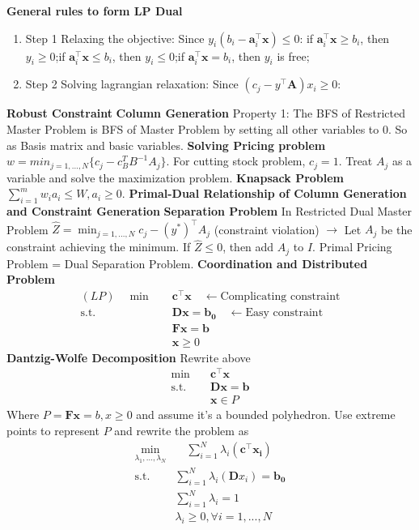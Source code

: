 \documentclass{article}
\def\x{\bm{x}}
\def\a{\bm{a}}
\def\A{\bm{A}}
\begin{document}
\textbf{General rules to form LP Dual}\
\begin{enumerate}
    \item Step 1 Relaxing the objective: Since $y_i(b_i-\a_i^\top \x ) \le 0$: if $\a_i^\top \x \ge b_i$, then $y_i \ge 0$;if $\a_i^\top \x \le b_i$, then $y_i \le 0$;if $\a_i^\top \x = b_i$, then $y_i$ is free;
    \item Step 2 Solving lagrangian relaxation: Since $(c_j-y^\top \A)x_i \ge 0$:
\end{enumerate}
\textbf{Robust Constraint}
\textbf{Column Generation} Property 1: The BFS of Restricted Master Problem is BFS of Master Problem by setting all other variables to 0. So as Basis matrix and basic variables.
\textbf{Solving Pricing problem} $w=min_{j=1,...,N}\{c_j-c_B^T B^{-1}A_j\}$. For cutting stock problem, $c_j=1$. Treat $A_j$ as a variable and solve the maximization problem.
\textbf{Knapsack Problem} $\sum_{i=1}^m w_ia_i \le W, a_i \ge 0$.
\textbf{Primal-Dual Relationship of Column Generation and Constraint Generation}
\textbf{Separation Problem} In Restricted Dual Master Problem $\hat{Z} = \min_{j=1,...,N}{c_j-(y^*)^\top A_j}$ (constraint violation) $\to$ Let $A_j$ be the constraint achieving the minimum. If $\hat{Z} \le 0$, then add $A_j$ to $I$. Primal Pricing Problem = Dual Separation Problem.
\textbf{Coordination and Distributed Problem}
\begin{align*}
    (LP) \quad \min \quad &\bm{c}^\top \bm{x} \quad \leftarrow \text{Complicating constraint} \\
    \text{s.t.} \quad & \bm{D}\bm{x}=\bm{b_0} \quad \leftarrow \text{Easy constraint}\\
    & \bm{F} \bm{x} = \bm{b} \\
    & \bm{x} \ge 0
\end{align*}
\textbf{Dantzig-Wolfe Decomposition} Rewrite above
\begin{align*}
    \min \quad & \bm{c}^\top \bm{x} \\
    \text{s.t.} \quad & \bm{D}\bm{x}=\bm{b} \\
    & \bm{x} \in P
\end{align*}
Where $P={\bm{F}\bm{x}=b, x \ge 0}$ and assume it's a bounded polyhedron. Use extreme points to represent $P$ and rewrite the problem as
\begin{align*}
    \min_{\lambda_1,...,\lambda_N} &\quad \sum_{i=1}^N \lambda_i(\bm{c}^\top \bm{x_i}) \\
    \text{s.t.} &\sum_{i=1}^N \lambda_i (\bm{D}x_i)=\bm{b_0} \\
    & \sum_{i=1}^N \lambda_i = 1 \\
    & \lambda_i \ge 0, \forall i=1,...,N
\end{align*}
\end{document}
